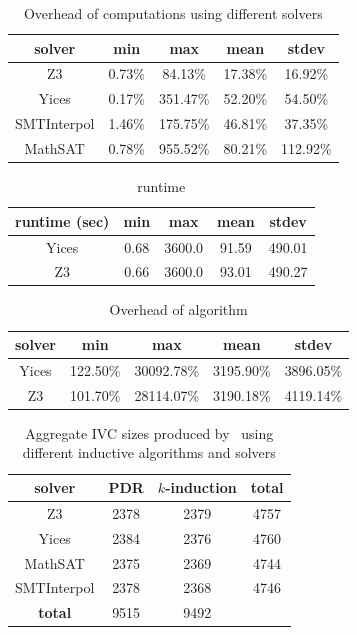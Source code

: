 \begin{table}
  \centering
  \begin{tabular}{ |c||c|c|c|c| }
    \hline
     solver & min & max & mean & stdev \\[0.5ex]
    \hline
    Z3   & 0.73\% & 84.13\% & 17.38\% & 16.92\% \\[0.5ex]
    Yices &   0.17\%  & 351.47\%   & 52.20\% & 54.50\% \\[0.5ex]
   SMTInterpol& 1.46\% & 175.75\% &  46.81\% & 37.35\%\\[0.5ex]
    MathSAT & 0.78\% & 955.52\% &  80.21\% & 112.92\%\\[0.5ex]
    \hline
  \end{tabular}
  \caption{Overhead of \ucalg computations using different solvers}
  \label{tab:overhead-ucalg}
\end{table}

\begin{table}
  \centering
  \begin{tabular}{ |c||c|c|c|c| }
    \hline
     runtime (sec) & min & max & mean & stdev \\[0.5ex]
    \hline
    Yices &   0.68  & 3600.0   & 91.59 & 490.01 \\[0.5ex]
    \hline
    Z3 &   0.66  & 3600.0   & 93.01 & 490.27 \\[0.5ex]
    \hline
  \end{tabular}
  \caption{\ucbfalg runtime}
  \label{tab:runtime-ucbfalg}
\end{table}

\begin{table}
  \centering
  \begin{tabular}{ |c||c|c|c|c| }
    \hline
     solver & min & max & mean & stdev \\[0.5ex]
    \hline
    Yices & 122.50\%  & 30092.78\%   & 3195.90\% & 3896.05\% \\[0.5ex]
    \hline
    Z3 & 101.70\%  & 28114.07\%   & 3190.18\% & 4119.14\% \\[0.5ex]
    \hline
  \end{tabular}
  \caption{Overhead of \ucbfalg algorithm}
  \label{tab:overhead-ucbfalg}
\end{table}

\begin{table}
  \centering
  \begin{tabular}{ |c|c|c|c| }
    \hline
     solver & PDR & $k$-induction & \textbf{total} \\
    \hline
      Z3 & 2378 & 2379 & 4757 \\
      Yices & 2384 & 2376 & 4760 \\
      MathSAT & 2375 & 2369 & 4744 \\
      SMTInterpol & 2378 & 2368 & 4746 \\
    \hline
      \textbf{total} & 9515 & 9492 &   \\
    \hline
  \end{tabular}
  \caption{Aggregate IVC sizes produced by \ucalg\ using different inductive algorithms and solvers}
  \label{tab:minimality-algorithm-solvers}
\end{table}


